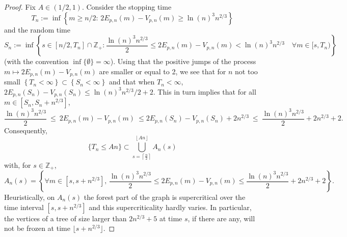 \documentclass[a4, 11pt]{article}
\numberwithin{equation}{section}
\theoremstyle{plain}
\theoremstyle{definition}
\theoremstyle{remark}
\begin{document}
	\begin{proof}
		Fix $A\in \left(1/2,1\right)$. Consider the stopping time
		$$T_n:=\inf\left\{m\geq n/2:\, 2E_{p,n}(m)-V_{p,n}(m)\geq \ln(n)^3 n^{2/3} \right\}$$
and the random time
$$S_n:=\inf\left\{s\in \left[n/2, T_n\right]\cap \mathbb Z_+ : \frac{\ln(n)^3 n^{2/3}}{2}\leq 2E_{p,n}(m)-V_{p,n}(m)<\ln(n)^3n^{2/3}\quad\forall m \in [s,T_n) \right\}$$
(with the convention $\inf\{\emptyset\}=\infty$). Using that the positive jumps of the process $m \mapsto 2E_{p,n}(m)-V_{p,n}(m)$ are smaller or equal to 2, 
we see that for $n$ not too small $\left\{T_n<\infty \right\}\subset \left\{S_n<\infty \right\}$ and that when $T_n<\infty$, $2E_{p,n}(S_n)-V_{p,n}(S_n)\leq \ln(n)^3n^{2/3}/2+2$. This in turn implies that
for all $m\in [S_n,S_n+n^{2/3}]$, 
$$\frac{\ln(n)^3 n^{2/3}}{2}~\leq~2E_{p,n}(m)-V_{p,n}(m)~\leq 2E_{p,n}(S_n)-V_{p,n}(S_n)+2n^{2/3}~\leq~\frac{\ln(n)^3 n^{2/3}}{2}+2n^{2/3}+2.$$
Consequently,
		\begin{equation}
			\{ T_n\leq An\}\subset\bigcup_{s=\left\lceil\frac{n}{2}\right\rceil}^{\left\lfloor An\right\rfloor}A_n(s)\label{eq:subs:surcrit}
		\end{equation} 
with, for $s \in \mathbb Z_+$, $$A_n(s)=\left\{\forall m\in \left[s,s+n^{2/3}\right],\, \frac{\ln(n)^3 n^{2/3}}{2}\leq 2E_{p,n}(m)-V_{p,n}(m)\leq\frac{\ln(n)^3 n^{2/3}}{2}+2n^{2/3}+2  \right\}.$$
Heuristically, on $A_n(s)$ the forest part of the graph is supercritical over the time interval $[s,s+n^{2/3}]$ and this supercriticality hardly varies. In particular, the vertices of a tree of size larger than $2n^{2/3}+5$ at time $s$, if there are any, will not be frozen at time $\lfloor s+n^{2/3} \rfloor$. 


\end{proof}
\end{document}
